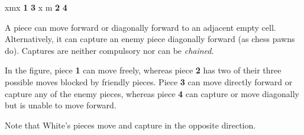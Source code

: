 \documentclass[a4paper,12pt]{article}
\begin{document}
    \begin{minipage}[c]{0.36\linewidth}
        \begin{center}
            \begin{othelloboardnorefs}{0.75}
                \annotationsfirstrow	{} {} {} {} {} {} {} {}
                 {} {{\sffamily x}}{{\sffamily m}}{{\sffamily x}}
                \annotationsthirdrow	{} {\textbf{1}}{} {} {} {} {\textbf{3}}{}
                \annotationsfourthrow	{} {} {} {} {} {} {} {}
                \annotationsfifthrow	{} {} {} {} {} {} {} {}
                 {} {} {} {{\sffamily x}}{} {{\sffamily m}}
                \annotationsseventhrow	{} {\textbf{2}}{} {} {} {} {\textbf{4}}{}
                \annotationseighthrow	{} {} {} {} {} {} {} {}
            \end{othelloboardnorefs}
        \end{center}
    \end{minipage}
    \hfill
    \begin{minipage}[c]{0.62\linewidth}
        A piece can move forward or diagonally forward to an adjacent empty cell.  Alternatively, it can capture an enemy piece diagonally forward (as chess pawns do).  Captures are neither compulsory nor can be \emph{chained}.

        In the figure, piece \textbf{1} can move freely, whereas piece \textbf{2} has two of their three possible moves blocked by friendly pieces.  Piece \textbf{3} can move directly forward or capture any of the enemy pieces, whereas piece \textbf{4} can capture or move diagonally but is unable to move forward.

        Note that White's pieces move and capture in the opposite direction.
    \end{minipage}

\end{document}
